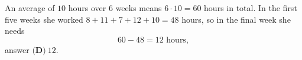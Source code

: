 An average of $10$ hours over $6$ weeks means $6\cdot10=60$ hours in total. In the first five weeks she worked $8+11+7+12+10=48$ hours, so in the final week she needs
\[
60-48=12\text{ hours},
\]
answer $\boxed{\textbf{(D)}\ 12}$.
